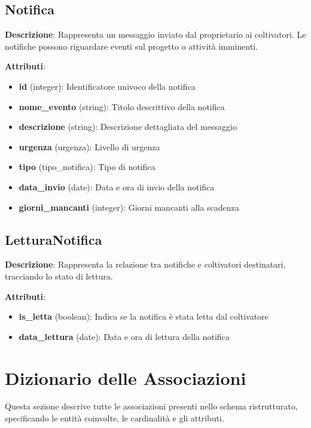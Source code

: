 \documentclass[12pt,a4paper]{article}
\begin{document}
\subsection{Notifica}

\textbf{Descrizione}: Rappresenta un messaggio inviato dal proprietario ai coltivatori. Le notifiche possono riguardare eventi sul progetto o attività imminenti.

\textbf{Attributi}:
\begin{itemize}[leftmargin=2.5cm]
    \item \textbf{id} (integer): Identificatore univoco della notifica
    \item \textbf{nome\_evento} (string): Titolo descrittivo della notifica
    \item \textbf{descrizione} (string): Descrizione dettagliata del messaggio
    \item \textbf{urgenza} (urgenza): Livello di urgenza
    \item \textbf{tipo} (tipo\_notifica): Tipo di notifica
    \item \textbf{data\_invio} (date): Data e ora di invio della notifica
    \item \textbf{giorni\_mancanti} (integer): Giorni mancanti alla scadenza
\end{itemize}

\subsection{LetturaNotifica}

\textbf{Descrizione}: Rappresenta la relazione tra notifiche e coltivatori destinatari, tracciando lo stato di lettura.

\textbf{Attributi}:
\begin{itemize}[leftmargin=2.5cm]
    \item \textbf{is\_letta} (boolean): Indica se la notifica è stata letta dal coltivatore
    \item \textbf{data\_lettura} (date): Data e ora di lettura della notifica
\end{itemize}

\newpage

\section{Dizionario delle Associazioni}

Questa sezione descrive tutte le associazioni presenti nello schema ristrutturato, specificando le entità coinvolte, le cardinalità e gli attributi.
\end{document}

